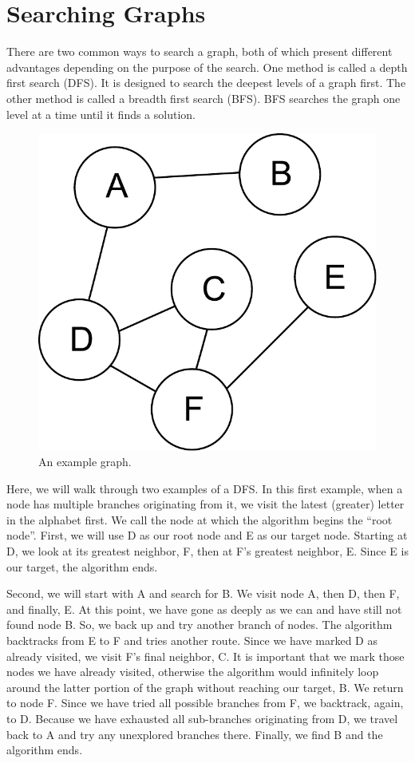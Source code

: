 \section*{Searching Graphs}
There are two common ways to search a graph, both of which present different advantages depending on the purpose of the search.
One method is called a depth first search (DFS).  It is designed to search the deepest levels of a graph first.
The other method is called a breadth first search (BFS).  BFS searches the graph one level at a time until it finds a solution.
\begin{figure}[h]
\centering
\includegraphics[width=.5\textwidth]{graph.pdf}
\caption{An example graph.}
\label{fig:bfs_dfs_graph}
\end{figure}


Here, we will walk through two examples of a DFS.
In this first example, when a node has multiple branches originating from it, we visit the latest (greater) letter in the alphabet first. 
We call the node at which the algorithm begins the ``root node''.
First, we will use D as our root node and E as our target node.
Starting at D, we look at its greatest neighbor, F, then at F's greatest neighbor, E.
Since E is our target, the algorithm ends.

Second, we will start with A and search for B.
We visit node A, then D, then F, and finally, E.
At this point, we have gone as deeply as we can and have still not found node B.
So, we back up and try another branch of nodes.
The algorithm backtracks from E to F and tries another route.
Since we have marked D as already visited, we visit F's final neighbor, C. It is important that we mark those nodes we have already visited, otherwise the algorithm would infinitely loop around the latter portion of the graph without reaching our target, B.
We return to node F. Since we have tried all possible branches from F, we backtrack, again, to D.
Because we have exhausted all sub-branches originating from D, we travel back to A and try any unexplored branches there.
Finally, we find B and the algorithm ends.

